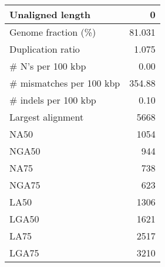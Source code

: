 \documentclass[12pt,a4paper]{article}
\begin{document}
\begin{table}[ht]
\begin{center}
\begin{tabular}{|l*{1}{|r}|}
Unaligned length & 0 \\ \hline
Genome fraction (\%) & 81.031 \\ \hline
Duplication ratio & 1.075 \\ \hline
\# N's per 100 kbp & 0.00 \\ \hline
\# mismatches per 100 kbp & 354.88 \\ \hline
\# indels per 100 kbp & 0.10 \\ \hline
Largest alignment & 5668 \\ \hline
NA50 & 1054 \\ \hline
NGA50 & 944 \\ \hline
NA75 & 738 \\ \hline
NGA75 & 623 \\ \hline
LA50 & 1306 \\ \hline
LGA50 & 1621 \\ \hline
LA75 & 2517 \\ \hline
LGA75 & 3210 \\ \hline
\end{tabular}
\end{center}
\end{table}
\end{document}
